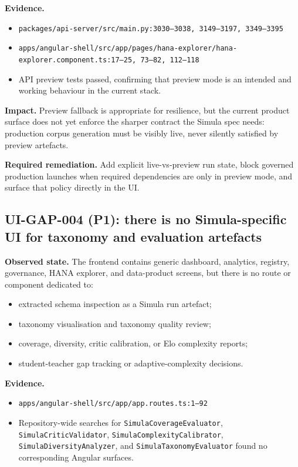 \documentclass[12pt,a4paper,twoside]{report}
\begin{document}
\textbf{Evidence.}
\begin{itemize}
\item \texttt{packages/api-server/src/main.py:3030--3038,
3149--3197, 3349--3395}
\item \texttt{apps/angular-shell/src/app/pages/hana-explorer/hana-explorer.component.ts:17--25, 73--82, 112--118}
\item API preview tests passed, confirming that preview mode is an
intended and working behaviour in the current stack.
\end{itemize}

\textbf{Impact.}
Preview fallback is appropriate for resilience, but the current
product surface does not yet enforce the sharper contract the Simula
spec needs: production corpus generation must be visibly live, never
silently satisfied by preview artefacts.

\textbf{Required remediation.}
Add explicit live-vs-preview run state, block governed production
launches when required dependencies are only in preview mode, and
surface that policy directly in the UI.

\subsection*{UI-GAP-004 (P1): there is no Simula-specific UI for taxonomy and evaluation artefacts}
\textbf{Observed state.}
The frontend contains generic dashboard, analytics, registry,
governance, HANA explorer, and data-product screens, but there is no
route or component dedicated to:
\begin{itemize}
\item extracted schema inspection as a Simula run artefact;
\item taxonomy visualisation and taxonomy quality review;
\item coverage, diversity, critic calibration, or Elo complexity
reports;
\item student-teacher gap tracking or adaptive-complexity
decisions.
\end{itemize}

\textbf{Evidence.}
\begin{itemize}
\item \texttt{apps/angular-shell/src/app/app.routes.ts:1--92}
\item Repository-wide searches for
\texttt{SimulaCoverageEvaluator},
\texttt{SimulaCriticValidator},
\texttt{SimulaComplexityCalibrator},
\texttt{SimulaDiversityAnalyzer}, and
\texttt{SimulaTaxonomyEvaluator} found no corresponding Angular
surfaces.
\end{itemize}
\end{document}
